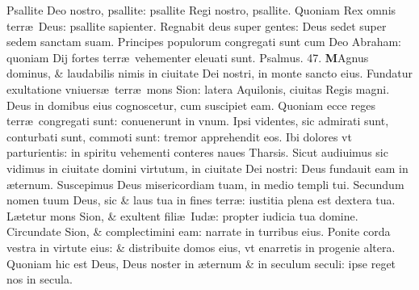\documentclass[a5paper,10pt]{book}
\def\ae{æ}
\begin{document}
\begin{multicols*}{2}
\newline \color{red} P\color{black}sallite Deo nostro, psallite: psallite Regi nostro, psallite.
\newline \color{red} Q\color{black}uoniam Rex omnis terr\ae \ Deus: psallite sapienter.
\newline \color{red} R\color{black}egnabit deus super gentes: Deus sedet super sedem sanctam suam.
\newline \color{red} P\color{black}rincipes populorum congregati sunt cum Deo Abraham: quoniam Dij fortes terr\ae \ vehementer eleuati sunt.
\newline \color{red} Psalmus. \hypertarget{ps47}{47.} \color{black}
\vspace{-1em}
\lettrine[lines=2]{\bfseries \color{red} M}{}Agnus dominus, \& laudabilis nimis in ciuitate Dei nostri, in monte sancto eius.
\newline \color{red} F\color{black}undatur exultatione vniuers\ae \ terr\ae \ mons Sion: latera Aquilonis, ciuitas Regis magni.
\newline \color{red} D\color{black}eus in domibus eius cognoscetur, cum suscipiet eam.
\newline \color{red} Q\color{black}uoniam ecce reges terr\ae \ congregati sunt: conuenerunt in vnum.
\newline \color{red} I\color{black}psi videntes, sic admirati sunt, conturbati sunt, commoti sunt: tremor apprehendit eos.
\newline \color{red} I\color{black}bi dolores vt parturientis: in spiritu vehementi conteres naues Tharsis.
\newline \color{red} S\color{black}icut audiuimus sic vidimus in ciuitate domini virtutum, in ciuitate Dei nostri: Deus fundauit eam in \ae ternum.
\newline \color{red} S\color{black}uscepimus Deus misericordiam tuam, in medio templi tui.
\newline \color{red} S\color{black}ecundum nomen tuum Deus, sic \& laus tua in fines terr\ae : iustitia plena est dextera tua.
\newline \color{red} L\color{black}\ae tetur mons Sion, \& exultent fili\ae \ Iud\ae : propter iudicia tua domine.
\newline \color{red} C\color{black}ircundate Sion, \& complectimini eam: narrate in turribus eius.
\newline \color{red} P\color{black}onite corda vestra in virtute eius: \& distribuite domos eius, vt enarretis in progenie altera.
\newline \color{red} Q\color{black}uoniam hic est Deus, Deus noster in \ae ternum \& in seculum seculi: ipse reget nos in secula.

\end{multicols*}
\end{document}
